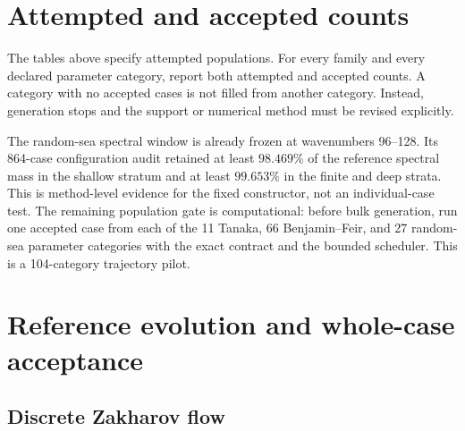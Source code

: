 \documentclass[11pt]{article}
\begin{document}
\section{Attempted and accepted counts}
\label{sec:coverage}

The tables above specify attempted populations.  For every family and every
declared parameter category, report both attempted and accepted counts.  A
category with no accepted cases is not filled from another category.  Instead, generation
stops and the support or numerical method must be revised explicitly.

The random-sea spectral window is already frozen at wavenumbers 96--128.  Its
864-case configuration audit retained at least $98.469\%$ of the reference
spectral mass in the shallow stratum and at least $99.653\%$ in the finite and
deep strata.  This is method-level evidence for the fixed constructor, not an
individual-case test.  The remaining population gate is computational:
before bulk generation, run one accepted case from
each of the 11 Tanaka, 66 Benjamin--Feir, and 27 random-sea parameter
categories with the exact contract and the bounded scheduler.  This is a
104-category trajectory pilot.

\section{Reference evolution and whole-case acceptance}
\label{sec:acceptance}

\subsection{Discrete Zakharov flow}
\end{document}
